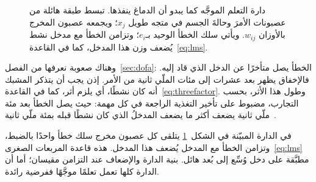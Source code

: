 \begin{figure}[t]
\centering
{}
\caption{دارة التعلم الموجَّه كما يبدو أن الدماغ ينفذها. تبسط طبقة هائلة من عصبونات  الأمرَ وحالةَ الجسم في متجه طويل $x_j$؛ ويجمعه عصبون  المخرج بالأوزان $w_{ij}$. ويأتي سلك الخطأ الوحيد بـ$e_i$؛ وتزامن الخطأ مع مدخل نشط يُضعف وزن هذا المدخل، كما في القاعدة~\eqref{eq:lms}.}
\label{fig:errorwire}
\end{figure}

وهناك صعوبة نعرفها من الفصل~\ref{sec:dofa}: الخطأ يصل متأخرًا عن الدخل الذي قاد إليه. فالإخفاق يظهر بعد عشرات إلى مئات الملّي ثانية من الأمر. إذن يجب أن يتذكر المشبك أنه كان نشطًا، أي يلزم أثر، كما في القاعدة~\eqref{eq:threefactor}. وطول هذا الأثر، بحسب التجارب، مضبوط على تأخير التغذية الراجعة في كل مهمة: حيث يصل الخطأ بعد مئة ملّي ثانية يضعف أكثر ما يضعف المدخلُ الذي كان نشطًا قبله بمئة ملّي ثانية~\cite{Suvrathan2016}.

\begin{keyblock}
\begin{proposition}
\label{prop:errorwire}
في الدارة المبيّنة في الشكل~\ref{fig:errorwire} يتلقى كل عصبون مخرج سلك خطأ واحدًا بالضبط، وتزامن الخطأ مع المدخل يُضعف هذا المدخل. هذه قاعدة المربعات الصغرى~\eqref{eq:lms} مطبَّقة على دخل وُسِّع إلى بُعد هائل. بنية الدارة والإضعاف عند التزامن مقيسان؛ أما أن الدارة كلها تعمل تعلمًا موجَّهًا ففرضية رائدة.
\end{proposition}
\end{keyblock}

